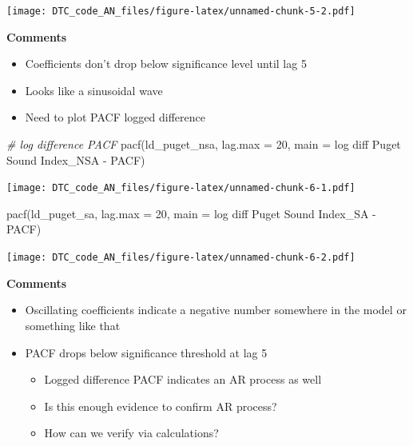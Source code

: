 \documentclass[
]{article}
\newenvironment{Shaded}{\begin{snugshade}}{\end{snugshade}}
\newcommand{\AttributeTok}[1]{\textcolor[rgb]{0.77,0.63,0.00}{#1}}
\newcommand{\CommentTok}[1]{\textcolor[rgb]{0.56,0.35,0.01}{\textit{#1}}}
\newcommand{\DecValTok}[1]{\textcolor[rgb]{0.00,0.00,0.81}{#1}}
\newcommand{\FunctionTok}[1]{\textcolor[rgb]{0.00,0.00,0.00}{#1}}
\newcommand{\NormalTok}[1]{#1}
\newcommand{\StringTok}[1]{\textcolor[rgb]{0.31,0.60,0.02}{#1}}
\providecommand{\tightlist}{%
  \setlength{\itemsep}{0pt}\setlength{\parskip}{0pt}}
\begin{document}
\texttt{[image: DTC\_code\_AN\_files/figure-latex/unnamed-chunk-5-2.pdf]}

\textbf{Comments}

\begin{itemize}
\tightlist
\item
  Coefficients don't drop below significance level until lag 5
\item
  Looks like a sinusoidal wave
\item
  Need to plot PACF logged difference
\end{itemize}

\begin{Shaded}
\begin{Highlighting}[]
\CommentTok{\# log difference PACF}
\FunctionTok{pacf}\NormalTok{(ld\_puget\_nsa, }\AttributeTok{lag.max =} \DecValTok{20}\NormalTok{, }\AttributeTok{main =} \StringTok{\textquotesingle{}log diff Puget Sound Index\_NSA {-} PACF\textquotesingle{}}\NormalTok{)}
\end{Highlighting}
\end{Shaded}

\texttt{[image: DTC\_code\_AN\_files/figure-latex/unnamed-chunk-6-1.pdf]}

\begin{Shaded}
\begin{Highlighting}[]
\FunctionTok{pacf}\NormalTok{(ld\_puget\_sa, }\AttributeTok{lag.max =} \DecValTok{20}\NormalTok{, }\AttributeTok{main =} \StringTok{\textquotesingle{}log diff Puget Sound Index\_SA {-} PACF\textquotesingle{}}\NormalTok{)}
\end{Highlighting}
\end{Shaded}

\texttt{[image: DTC\_code\_AN\_files/figure-latex/unnamed-chunk-6-2.pdf]}

\textbf{Comments}

\begin{itemize}
\item
  Oscillating coefficients indicate a negative number somewhere in the
  model or something like that
\item
  PACF drops below significance threshold at lag 5

  \begin{itemize}
  \tightlist
  \item
    Logged difference PACF indicates an AR process as well
  \item
    Is this enough evidence to confirm AR process?
  \item
    How can we verify via calculations?
  \end{itemize}
\end{itemize}
\end{document}
